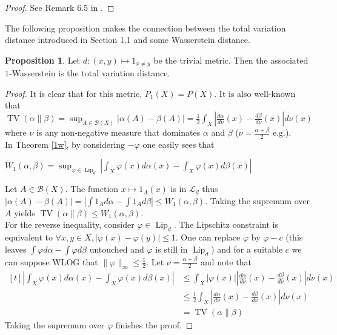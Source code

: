 \documentclass[12pt]{report}
\theoremstyle{definition}
\newtheorem{prop}[defi]{Proposition}
\theoremstyle{remark}
\DeclareMathOperator{\tv}{TV}
\DeclareMathOperator{\lip}{Lip}
\begin{document}
\begin{proof}
	See Remark 6.5 in \cite{villani2008optimal}.
\end{proof}

The following proposition makes the connection between the total variation distance introduced in Section 1.1 and some Wasserstein distance.
\begin{prop}
	Let $d:(x,y)\mapsto 1_{x\neq y}$ be the trivial metric. Then the associated $1$-Wasserstein is the total variation distance.
\end{prop}

\begin{proof}
	It is clear that for this metric, $P_1(X)=P(X)$.
	It is also well-known \cite[Section~2.4]{tsybakov2004introduction} that $\tv(\alpha\|\beta) = \sup_{A\in \mathcal B(X)} |\alpha(A)-\beta(A)| = \frac 12 \int_X \left|\frac{d\alpha}{d\nu}(x)-\frac{d\beta}{d\nu}(x) \right| d\nu(x)$ where $\nu$ is any non-negative measure that dominates $\alpha$ and $\beta$ ($\nu= \frac{\alpha+\beta}2$ e.g.).\\
	In Theorem \ref{1w}, by considering $-\varphi$ one easily sees that \begin{center}
		$\displaystyle W_1(\alpha, \beta)= \sup_{\varphi \in \lip_d} \left|\int_X \varphi(x) d\alpha(x) - \int_X \varphi(x) d\beta(x)\right|$
	\end{center}
	Let $A\in \mathcal B(X)$. The function $x\mapsto 1_A(x)$ is in $\mathcal L_d$ thus $|\alpha(A)-\beta(A)|=\left|\int 1_A d\alpha-\int 1_A d\beta \right|\leq W_1(\alpha, \beta)$. Taking the supremum over $A$ yields $\tv(\alpha\|\beta)\leq W_1(\alpha, \beta)$.\\
	For the reverse inequality, consider $\varphi\in \lip_d$. The Lipschitz constraint is equivalent to $\forall x,y\in X, |\varphi(x)-\varphi(y)|\leq 1$. One can replace $\varphi$ by $\varphi-c$ (this leaves $\int \varphi d\alpha - \int \varphi d\beta$ untouched and $\varphi$ is still in $\lip_d$) and for a suitable $c$ we can suppose WLOG that $\|\varphi\|_\infty \leq \frac 12$. Let $\nu= \frac{\alpha+\beta}2$ and note that 
	$\begin{aligned}[t] \left|\int_X \varphi(x) d\alpha(x) - \int_X \varphi(x) d\beta(x)\right|
	&\leq \int_X |\varphi(x)| \left|\frac{d\alpha}{d\nu}(x)-\frac{d\beta}{d\nu}(x) \right| d\nu(x)\\
	&\leq \frac 12 \int_X \left|\frac{d\alpha}{d\nu}(x)-\frac{d\beta}{d\nu}(x) \right| d\nu(x)\\
	&= \tv(\alpha\|\beta)
	 \end{aligned}$
	Taking the supremum over $\varphi$ finishes the proof.
\end{proof}
\end{document}
